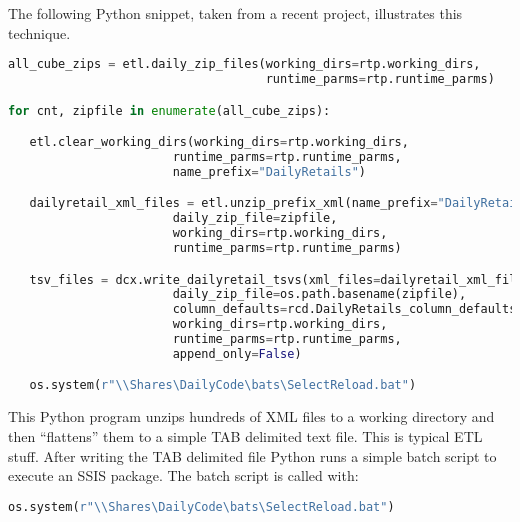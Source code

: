 The following Python snippet, taken from a recent project, illustrates
this technique.

\begin{tcolorbox}[breakable, size=fbox, boxrule=1pt, pad at break*=1mm,colback=cellbackground, colframe=cellborder]
\begin{lstlisting}[language=python, frame=single, framerule=0pt, label=lst:scr7103x0]
all_cube_zips = etl.daily_zip_files(working_dirs=rtp.working_dirs, 
                                    runtime_parms=rtp.runtime_parms)

for cnt, zipfile in enumerate(all_cube_zips):

   etl.clear_working_dirs(working_dirs=rtp.working_dirs, 
                       runtime_parms=rtp.runtime_parms, 
                       name_prefix="DailyRetails")

   dailyretail_xml_files = etl.unzip_prefix_xml(name_prefix="DailyRetails", 
                       daily_zip_file=zipfile, 
                       working_dirs=rtp.working_dirs,
                       runtime_parms=rtp.runtime_parms)

   tsv_files = dcx.write_dailyretail_tsvs(xml_files=dailyretail_xml_files, 
                       daily_zip_file=os.path.basename(zipfile), 
                       column_defaults=rcd.DailyRetails_column_defaults, 
                       working_dirs=rtp.working_dirs,
                       runtime_parms=rtp.runtime_parms,
                       append_only=False)

   os.system(r"\\Shares\DailyCode\bats\SelectReload.bat")
\end{lstlisting}
\end{tcolorbox}


This Python program unzips hundreds of XML files to a working directory
and then ``flattens'' them to a simple TAB delimited text file. This is
typical ETL stuff. After writing the TAB delimited file Python runs a
simple batch script to execute an SSIS package. The batch script is
called with:

\begin{tcolorbox}[breakable, size=fbox, boxrule=1pt, pad at break*=1mm,colback=cellbackground, colframe=cellborder]
\begin{lstlisting}[language=python, frame=single, framerule=0pt, label=lst:scr7103x1]
 os.system(r"\\Shares\DailyCode\bats\SelectReload.bat")
\end{lstlisting}
\end{tcolorbox}


